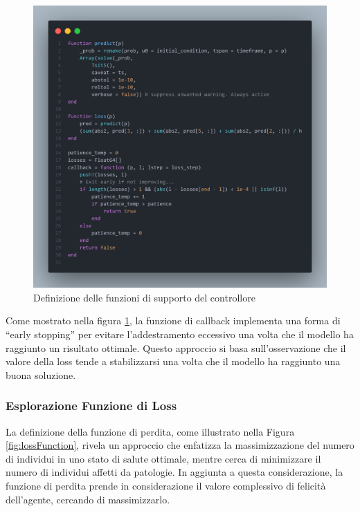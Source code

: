 \begin{figure}[H]
    \begin{center}
		\includegraphics[width=\textwidth]{img/controller2.png}
		\caption{Definizione delle funzioni di supporto del controllore}
		\label{fig:controller2}
	\end{center}
\end{figure}

Come mostrato nella figura \ref{fig:controller2}, la funzione di 
callback implementa una forma di ``early stopping'' per evitare 
l'addestramento eccessivo una volta che il modello ha raggiunto un 
risultato ottimale. Questo approccio si basa sull'osservazione che 
il valore della loss tende a stabilizzarsi una volta che il modello 
ha raggiunto una buona soluzione.

\newpage

\subsubsection{Esplorazione Funzione di Loss}

La definizione della funzione di perdita, come illustrato nella Figura 
\ref{fig:lossFunction}, rivela un approccio che enfatizza la 
massimizzazione del numero di individui in uno stato di salute ottimale, 
mentre cerca di minimizzare il numero di individui affetti da patologie. 
In aggiunta a questa considerazione, la funzione di perdita prende in 
considerazione il valore complessivo di felicità dell'agente, cercando di 
massimizzarlo. 

